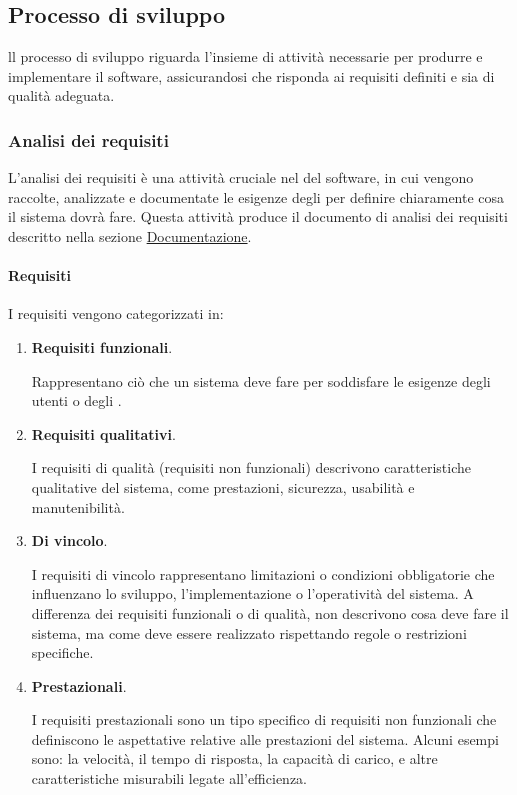 \subsection{Processo di sviluppo}
\label{subsection:processo_sviluppo}
ll processo di sviluppo riguarda l'insieme di attività necessarie per produrre e implementare il software, assicurandosi che risponda ai requisiti definiti e sia di qualità adeguata.

\subsubsection{Analisi dei requisiti}
L'analisi dei requisiti è una attività cruciale nel  del software, in cui vengono raccolte, analizzate e documentate le esigenze degli  per definire chiaramente cosa il sistema dovrà fare. 
Questa attività produce il documento di analisi dei requisiti descritto nella sezione \hyperref[subsec:documentazione]{Documentazione}.

\paragraph{Requisiti}
I requisiti vengono categorizzati in:
\begin{enumerate}
    \item \textbf{Requisiti funzionali}.
    
    Rappresentano ciò che un sistema deve fare per soddisfare le esigenze degli utenti o degli .

    \item \textbf{Requisiti qualitativi}.
    
    I requisiti di qualità (requisiti non funzionali) descrivono caratteristiche qualitative del sistema, come prestazioni, sicurezza, usabilità e manutenibilità.

    \item \textbf{Di vincolo}.
    
    I requisiti di vincolo rappresentano limitazioni o condizioni obbligatorie che influenzano lo sviluppo, l'implementazione o l'operatività del sistema. 
    A differenza dei requisiti funzionali o di qualità, non descrivono cosa deve fare il sistema, ma come deve essere realizzato rispettando regole o restrizioni specifiche. 

    \item \textbf{Prestazionali}.
    
    I requisiti prestazionali sono un tipo specifico di requisiti non funzionali che definiscono le aspettative relative alle prestazioni del sistema.
    Alcuni esempi sono: la velocità, il tempo di risposta, la capacità di carico, e altre caratteristiche misurabili legate all'efficienza.
\end{enumerate}


